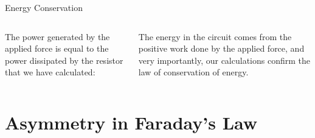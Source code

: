 \documentclass[12pt,aspectratio=169]{beamer}
\begin{document}
\begin{frame}{Energy Conservation}
  \begin{columns}
        
    The power generated by the applied force is equal to the power dissipated
    by the resistor that we have calculated:


    The energy in the circuit comes from the positive work done by the applied
    force, and very importantly, our calculations confirm the law of
    conservation of energy.
  \end{columns}
\end{frame}



\section{Asymmetry in Faraday's Law}
\end{document}
